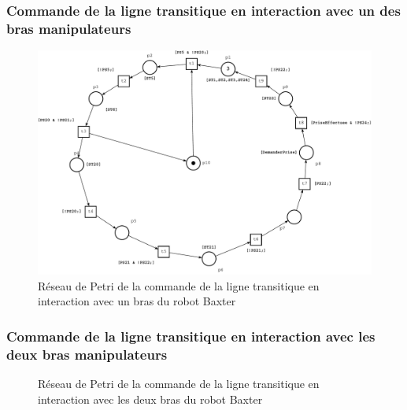 \documentclass[a4paper,french, titlepage]{book}
\begin{document}
\subsubsection{Commande de la ligne transitique en interaction avec un des bras manipulateurs}

 

\begin{figure}[H] 
\begin{center}
\includegraphics[scale=0.5]{Images/main_commande_baxter_1_bras_ligne_transitique.pdf} 
\end{center}
\caption{Réseau de Petri de la commande de la ligne transitique en interaction avec un bras du robot Baxter}
\label{main_commande_baxter_1_bras_ligne_transitique}
\end{figure}

\subsubsection{Commande de la ligne transitique en interaction avec les deux bras manipulateurs}


\begin{figure}[H] 
\begin{center}
\end{center}
\caption{Réseau de Petri de la commande de la ligne transitique en interaction avec les deux bras du robot Baxter}
\label{main_commande_baxter_2_bras_ligne_transitique}
\end{figure}
\end{document}
